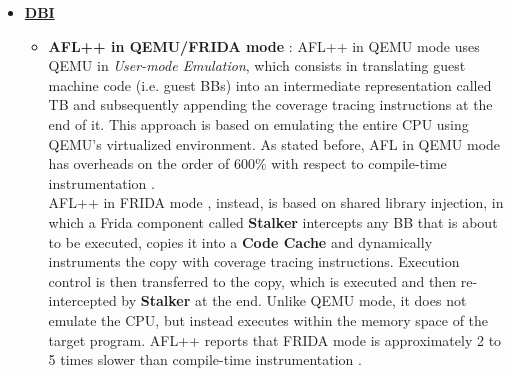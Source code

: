         \begin{itemize}
            \item \underline{\textbf{\gls{DBI}}}
            \begin{itemize}
                \item \textbf{AFL++ in QEMU/FRIDA mode} \cite{aflplusplus}: AFL++ in QEMU mode uses QEMU in \textit{User-mode Emulation},
                    which consists in translating guest machine code (i.e. guest \gls{BB}s) into an intermediate representation
                    called \gls{TB} and subsequently appending the coverage tracing instructions at the end of it.
                    This approach is based on emulating the entire CPU using QEMU's virtualized environment. As stated before,
                    AFL in QEMU mode has overheads on the order of 600\% with respect to compile-time instrumentation \cite{zafl}.\\
                    AFL++ in FRIDA mode \cite{aflplusplus-frida-mode}, instead, is based on shared library injection, in which a Frida \cite{frida} component
                    called \textbf{Stalker} intercepts any \gls{BB} that is about to be executed, copies it into a \textbf{Code Cache}
                    and dynamically instruments the copy with coverage tracing instructions.
                    Execution control is then transferred to the copy, which is executed and then re-intercepted by \textbf{Stalker} at the end.
                    Unlike QEMU mode, it does not emulate the CPU, but instead executes within the memory space of the target program.
                    AFL++ reports that FRIDA mode is approximately 2 to 5 times slower than compile-time instrumentation \cite{aflplusplus_binary_only_targets}.


\end{itemize}
\end{itemize}
